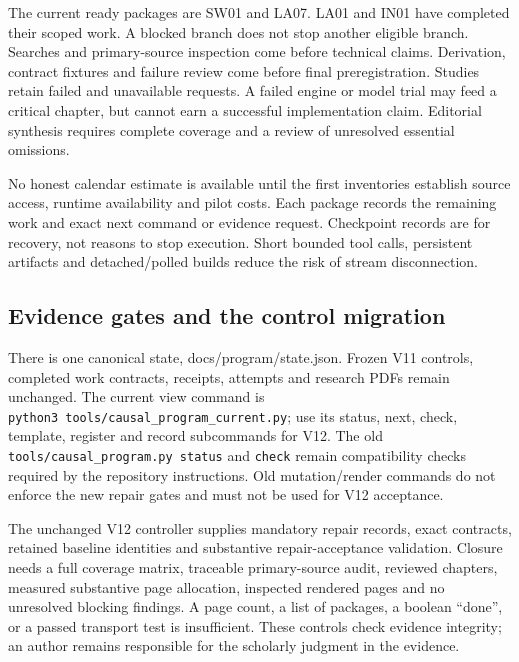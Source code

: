 \documentclass[
  11pt,
  a4paper,
]{article}
\begin{document}
The current ready packages are SW01 and LA07. LA01 and IN01 have
completed their scoped work. A blocked branch does not stop another
eligible branch. Searches and primary-source inspection come before
technical claims. Derivation, contract fixtures and failure review come
before final preregistration. Studies retain failed and unavailable
requests. A failed engine or model trial may feed a critical chapter,
but cannot earn a successful implementation claim. Editorial synthesis
requires complete coverage and a review of unresolved essential
omissions.

No honest calendar estimate is available until the first inventories
establish source access, runtime availability and pilot costs. Each
package records the remaining work and exact next command or evidence
request. Checkpoint records are for recovery, not reasons to stop
execution. Short bounded tool calls, persistent artifacts and
detached/polled builds reduce the risk of stream disconnection.

\hypertarget{evidence-gates-and-the-control-migration}{%
\subsection{Evidence gates and the control
migration}\label{evidence-gates-and-the-control-migration}}

There is one canonical state, docs/program/state.json. Frozen V11
controls, completed work contracts, receipts, attempts and research PDFs
remain unchanged. The current view command is
\texttt{python3\ tools/causal\_program\_current.py}; use its status,
next, check, template, register and record subcommands for V12. The old
\texttt{tools/causal\_program.py\ status} and \texttt{check} remain
compatibility checks required by the repository instructions. Old
mutation/render commands do not enforce the new repair gates and must
not be used for V12 acceptance.

The unchanged V12 controller supplies mandatory repair records, exact
contracts, retained baseline identities and substantive
repair-acceptance validation. Closure needs a full coverage matrix,
traceable primary-source audit, reviewed chapters, measured substantive
page allocation, inspected rendered pages and no unresolved blocking
findings. A page count, a list of packages, a boolean ``done'', or a
passed transport test is insufficient. These controls check evidence
integrity; an author remains responsible for the scholarly judgment in
the evidence.
\end{document}
